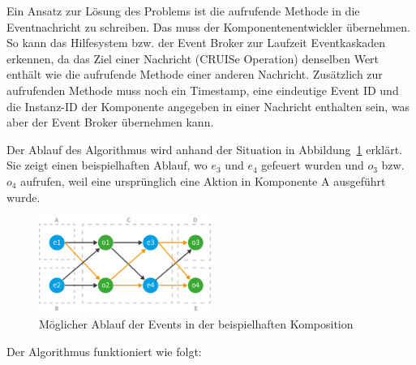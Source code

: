 \documentclass[
	headsepline,
	footsepline,
	fontsize=12pt,
	bibliography=totoc
]{scrbook}
\begin{document}

Ein Ansatz zur Lösung des Problems ist die aufrufende Methode in die Eventnachricht zu schreiben. Das muss der Komponentenentwickler übernehmen. So kann das Hilfesystem bzw. der Event Broker zur Laufzeit Eventkaskaden erkennen, da das Ziel einer Nachricht (CRUISe Operation) denselben Wert enthält wie die aufrufende Methode einer anderen Nachricht. Zusätzlich zur aufrufenden Methode muss noch ein Timestamp, eine eindeutige Event ID und die Instanz-ID der Komponente angegeben in einer Nachricht enthalten sein, was aber der Event Broker übernehmen kann.


Der Ablauf des Algorithmus wird anhand der Situation in Abbildung~\ref{figure:dependency-graph} erklärt. Sie zeigt einen beispielhaften Ablauf, wo $e_3$ und $e_4$ gefeuert wurden und $o_3$ bzw. $o_4$ aufrufen, weil eine ursprünglich eine Aktion in Komponente A ausgeführt wurde.

\begin{figure}[htbp]
   \centering
   \includegraphics[width=0.5\textwidth]{images/konzeption-dependency-graph.png}
   \caption{Möglicher Ablauf der Events in der beispielhaften Komposition}
   \label{figure:dependency-graph}
\end{figure}

Der Algorithmus funktioniert wie folgt:
\end{document}
